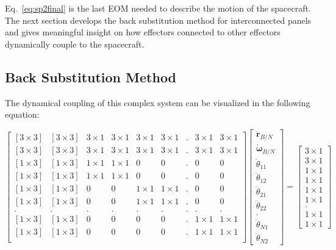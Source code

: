 \documentclass[paper]{aiaaNew}
\begin{document}
Eq.~\eqref{eq:sp2final} is the last EOM needed to describe the motion of the spacecraft. The next section develops the back substitution method for interconnected panels and gives meaningful insight on how effectors connected to other effectors dynamically couple to the spacecraft. 

	\subsection{Back Substitution Method}
	The dynamical coupling of this complex system can be visualized in the following equation:
	
	\begin{equation}
	\begin{bmatrix}
	[3\times 3] & [3\times 3] & 3\times 1 & 3\times 1 & 3\times 1 & 3\times 1 & . & 3\times 1 & 3\times 1\\
	[3\times 3] & [3\times 3] & 3\times 1 & 3\times 1 & 3\times 1 & 3\times 1 & . & 3\times 1 & 3\times 1\\
	[1\times 3] & [1\times 3] & 1\times 1 & 1\times 1  & 0 & 0 & . & 0 & 0\\
	[1\times 3] & [1\times 3] & 1\times 1 & 1\times 1  & 0 & 0 & . & 0 & 0\\
	[1\times 3] & [1\times 3] & 0 & 0  & 1\times 1 & 1\times 1 & . & 0 & 0 \\
	[1\times 3] & [1\times 3] & 0 & 0  & 1\times 1 & 1\times 1 & . & 0 & 0\\
	. & . & . & . & . & . & . & . & .\\
	[1\times 3] & [1\times 3] & 0 & 0  & 0 & 0 & . & 1\times 1 & 1\times 1\\
	[1\times 3] & [1\times 3] & 0 & 0  & 0 & 0 & . & 1\times 1 & 1\times 1\\
	\end{bmatrix}
	\begin{bmatrix}
	\ddot{\boldsymbol{r}}_{B/N}\\
	\dot{\boldsymbol{\omega}}_{B/N}\\
	\ddot{\theta}_{11}\\
	\ddot{\theta}_{12}\\
	\ddot{\theta}_{21}\\
	\ddot{\theta}_{22}\\
	.\\
	\ddot{\theta}_{N1}\\
	\ddot{\theta}_{N2}
	\end{bmatrix}
	=
	\begin{bmatrix}
	3\times 1\\
	3\times 1\\
	1\times 1\\
	1\times 1\\
	1\times 1\\
	1\times 1\\
	.\\
	1\times 1\\
	1\times 1
	\end{bmatrix}
	\end{equation}
\end{document}
